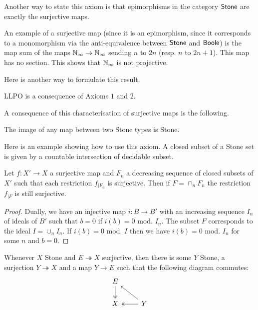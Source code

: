 Another way to state this axiom is that epimorphisms in the category $\mathsf{Stone}$ are exactly the surjective maps.

\medskip

An example of a surjective map (since it is an epimorphism, since it corresponds to a monomorphism via the anti-equivalence
between $\mathsf{Stone}$ and $\mathsf{Boole}$) is the map sum of the maps $\mathbb{N}_{\infty}\rightarrow \mathbb{N}_{\infty}$ sending $n$ to $2n$ (resp. $n$ to $2n+1$).
This map has no section. This shows that $\mathbb{N}_{\infty}$ is not projective.

Here is another way to formulate this result.

\begin{proposition}
  LLPO is a consequence of Axioms $1$ and $2$.
\end{proposition}

A consequence of this characterisation of surjective maps is the following.

\begin{proposition}
  The image of any map between two Stone types is Stone.
\end{proposition}

Here is an example showing how to use this axiom. A closed subset of a Stone set is given by a countable
intersection of decidable subset.

\begin{proposition}
  Let $f:X'\rightarrow X$ a surjective map and $F_n$ a decreasing sequence of closed subsets of $X'$ such that
  each restriction $f_{|F_n}$ is surjective. Then if $F = \cap_n F_n$ the restriction $f_{|F}$ is still surjective.
\end{proposition}

\begin{proof}
  Dually, we have an injective map $i:B\rightarrow B'$ with an increasing sequence $I_n$ of ideals of $B'$ such that
  $b = 0$ if $i(b) = 0$ mod. $I_n$. The subset $F$ corresponds to the ideal $I = \cup_n I_n$. If $i(b) = 0$ mod. $I$
  then we have $i(b) = 0$ mod. $I_n$ for some $n$ and $b = 0$. 
\end{proof}





\begin{axiom}
  Whenever $X$ Stone and $E\twoheadrightarrow X$ surjective, then there is some $Y$ Stone,
    a surjection $Y \twoheadrightarrow X$ and a map $Y\to E$ such that the following diagram commutes:
    \begin{equation}\begin{tikzcd}
      E \arrow[d,""',two heads]\\
      X & \arrow[l, "", two heads] Y\arrow[lu, ""']
    \end{tikzcd}\end{equation}  
\end{axiom} 




